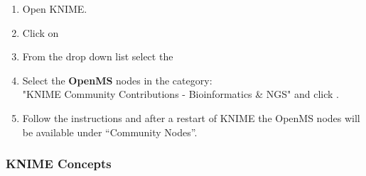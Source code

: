 \begin{enumerate}
\item Open KNIME.
\item Click on 
  

  \item From the  drop down list select the \\ 
\item Select the \textbf{OpenMS} nodes in the category: \\ "KNIME Community Contributions - Bioinformatics \& NGS" and click .
\item Follow the instructions and after a restart of KNIME the OpenMS nodes will be available under “Community Nodes”.
\end{enumerate}


\subsubsection{KNIME Concepts}

